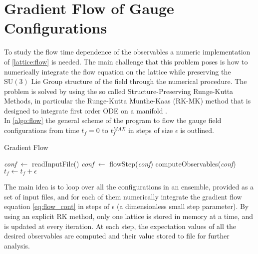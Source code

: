 \section{Gradient Flow of Gauge Configurations}
To study the flow time dependence of the observables a numeric implementation of \cref{lattice:flow} is needed. The main challenge that this problem poses is how to numerically integrate the flow equation on the lattice while preserving the $\mathrm{SU}(3)$ Lie Group structure of the field through the numerical procedure. The problem is solved by using the so called Structure-Preserving Runge-Kutta Methods, in particular the Runge-Kutta Munthe-Kaas (RK-MK) method that is designed to integrate first order ODE on a manifold \cite{munthe-kaas_runge-kutta_1998,munthe-kaas_lie-butcher_1995,celledoni_introduction_2014}. \\
In \cref{algo:flow} the general scheme of the program to flow the gauge field configurations from time $t_f=0$ to $t_f^{MAX}$ in steps of size $\epsilon$ is outlined.
\begin{algorithm}[bht!]
    \caption{Gradient Flow}\label{algo:flow}
    \begin{algorithmic}[1]
        \State \textit{conf} $\gets$ readInputFile()     
            \State \textit{conf} $\gets $ flowStep(\textit{conf})
            \State computeObservables(\textit{conf}) 
            \State $t_f \gets  t_f + \epsilon$
        \EndFor
    \EndFor
\end{algorithmic}
\end{algorithm}

The main idea is to loop over all the configurations in an ensemble, provided as a set of input files, and for each of them numerically integrate the gradient flow equation \cref{eq:flow_cont} in steps of $\epsilon$ (a dimensionless small step parameter). By using an explicit RK method, only one lattice is stored in memory at a time, and is updated at every iteration. At each step, the expectation values of all the desired observables are computed and their value stored to file for further analysis.


